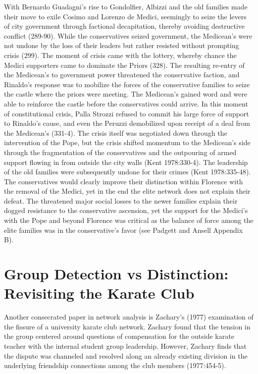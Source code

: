 \documentclass[12pt]{article}
\begin{document}
With Bernardo Guadagni’s rise to Gondolfier, Albizzi and the old families made their move to exile Cosimo and Lorenzo de Medici, seemingly to seize the levers of city government through factional decapitation, thereby avoiding destructive conflict (289-90). While the conservatives seized government, the Medicean’s were not undone by the loss of their leaders but rather resisted without prompting crisis (299). The moment of crisis came with the lottery, whereby chance the Medici supporters came to dominate the Priors (328). The resulting re-entry of the Medicean’s to government power threatened the conservative faction, and Rinaldo’s response was to mobilize the forces of the conservative families to seize the castle where the priors were meeting. The Medicean’s gained word and were able to reinforce the castle before the conservatives could arrive. In this moment of constitutional crisis, Palla Strozzi refused to commit his large force of support to Rinaldo’s cause, and even the Peruzzi demobilized upon receipt of a deal from the Medicean’s (331-4). The crisis itself was negotiated down through the intervention of the Pope, but the crisis shifted momentum to the Medicean’s side through the fragmentation of the conservatives and the outpouring of armed support flowing in from outside the city walls (Kent 1978:330-4). The leadership of the old families were subsequently undone for their crimes (Kent 1978:335-48). The conservatives would clearly improve their distinction within Florence with the removal of the Medici, yet in the end the elite network does not explain their defeat. The threatened major social losses to the newer families explain their dogged resistance to the conservative ascension, yet the support for the Medici’s with the Pope and beyond Florence was critical as the balance of force among the elite families was in the conservative’s favor (see Padgett and Ansell Appendix B).  

\section{Group Detection vs Distinction: Revisiting the Karate Club}
Another consecrated paper in network analysis is Zachary’s (1977) examination of the fissure of a university karate club network. Zachary found that the tension in the group centered around questions of compensation for the outside karate teacher with the internal student group leadership. However, Zachary finds that the dispute was channeled and resolved along an already existing division in the underlying friendship connections among the club members (1977:454-5).   
\end{document}
